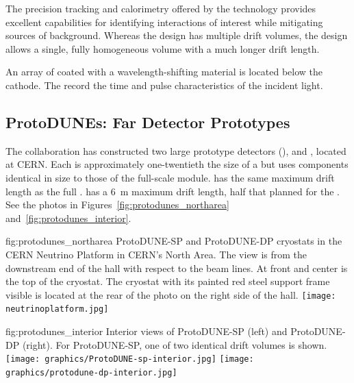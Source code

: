 The precision tracking and calorimetry offered by the  technology provides excellent capabilities for identifying interactions of interest while mitigating sources of background.  Whereas the  design has multiple drift volumes, the  design allows a single, fully homogeneous  volume with a much longer drift length.

An array of  coated with a wavelength-shifting material is located below the cathode. The  record  the time and pulse characteristics of the incident light.



\FloatBarrier

\subsection{ProtoDUNEs: Far Detector Prototypes}

The  collaboration has constructed 
two large prototype detectors (),  and , located at CERN. %
 Each is approximately one-twentieth the size of a   but uses components identical in size to those of the full-scale module.  has the same \spmaxdrift maximum drift length as the full .  has a \SI{6}{m} maximum drift length, half that planned for the . See the photos in Figures~\ref{fig:protodunes_northarea} and~\ref{fig:protodunes_interior}.

\begin{dunefigure}
{fig:protodunes_northarea}
{ProtoDUNE-SP and ProtoDUNE-DP cryostats in the CERN Neutrino Platform in CERN's North Area.  The view is from the downstream end of the hall with respect to the beam lines.  At front and  center is the top of the  cryostat.  The  cryostat with its painted red steel support frame visible is located at the rear of the photo on the right side of the hall.} 
\texttt{[image: neutrinoplatform.jpg]}
\end{dunefigure}

\begin{dunefigure}
{fig:protodunes_interior}
{Interior views of ProtoDUNE-SP (left) and ProtoDUNE-DP (right). For ProtoDUNE-SP, one of two identical drift volumes is shown.}
\texttt{[image: graphics/ProtoDUNE-sp-interior.jpg]}\hspace{0.05\linewidth}
\texttt{[image: graphics/protodune-dp-interior.jpg]}
\end{dunefigure}

